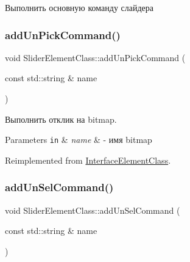 Выполнить основную команду слайдера 

\mbox{\label{class_slider_element_class_a2844280cd2d938b7f96e5e9640de4d09}} 
\subsubsection{\texorpdfstring{add\+Un\+Pick\+Command()}{addUnPickCommand()}}
{\footnotesize\ttfamily void Slider\+Element\+Class\+::add\+Un\+Pick\+Command (\begin{DoxyParamCaption}\item[{const std\+::string \&}]{name }\end{DoxyParamCaption})\hspace{0.3cm}{\ttfamily [virtual]}}



Выполнить отклик на bitmap. 


\begin{DoxyParams}[1]{Parameters}
\mbox{\tt in}  & {\em name} & -\/ имя bitmap \\
\hline
\end{DoxyParams}


Reimplemented from \hyperlink{class_interface_element_class_a318c70a834096462e9ed764f32fe3065}{Interface\+Element\+Class}.

\mbox{\label{class_slider_element_class_aab0bdceef3fb3407c0d56d0011806a21}} 
\subsubsection{\texorpdfstring{add\+Un\+Sel\+Command()}{addUnSelCommand()}}
{\footnotesize\ttfamily void Slider\+Element\+Class\+::add\+Un\+Sel\+Command (\begin{DoxyParamCaption}\item[{const std\+::string \&}]{name }\end{DoxyParamCaption})\hspace{0.3cm}{\ttfamily [virtual]}}



